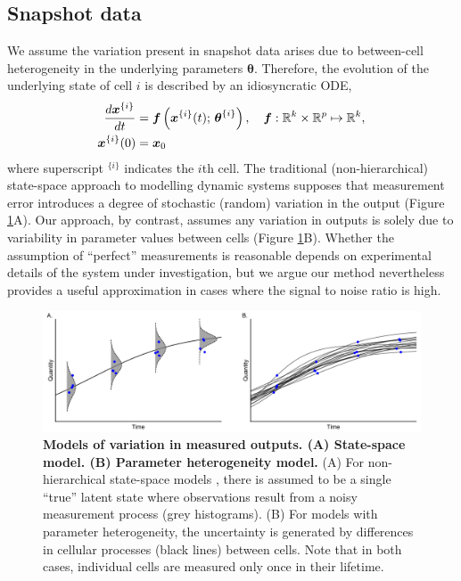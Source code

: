 \subsection{Snapshot data}
We assume the variation present in snapshot data arises due to between-cell heterogeneity in the underlying parameters $\boldsymbol{\theta}$. Therefore, the evolution of the underlying state of cell $i$ is described by an idiosyncratic ODE,
%
\begin{equation} \label{eq:ode_i}
\begin{aligned}
\frac{d\boldsymbol{x}^{\{i\}}}{dt} &= \boldsymbol{f} \left( \boldsymbol{x}^{\{i\}}(t); \, \boldsymbol{\theta}^{\{i\}} \right),
                                      \quad \boldsymbol{f}: \mathbb{R}^k \times \mathbb{R}^p \mapsto \mathbb{R}^k, \\
\boldsymbol{x}^{\{i\}}(0) &= \boldsymbol{x}_0
\end{aligned}
\end{equation}
where superscript $^{\{i\}}$ indicates the $i$th cell.
%
The traditional (non-hierarchical) state-space approach to modelling dynamic systems supposes that measurement error introduces a degree of stochastic (random) variation in the output (Figure \ref{fig:data_generation}A). Our approach, by contrast, assumes any variation in outputs is solely due to variability in parameter values between cells (Figure \ref{fig:data_generation}B). Whether the assumption of ``perfect'' measurements is reasonable depends on experimental details of the system under investigation, but we argue our method nevertheless provides a useful approximation in cases where the signal to noise ratio is high.

\begin{figure}[H]
  \centerline{\includegraphics[width=\textwidth]{../figures/data_generation.pdf}}
  \caption{\textbf{Models of variation in measured outputs. (A) State-space model. (B) Parameter heterogeneity model.} (A) For non-hierarchical state-space models , there is assumed to be a single ``true'' latent state where observations result from a noisy measurement process (grey histograms). (B) For models with parameter heterogeneity, the uncertainty is generated by differences in cellular processes (black lines) between cells. Note that in both cases, individual cells are measured only once in their lifetime.}
  \label{fig:data_generation}
\end{figure}

